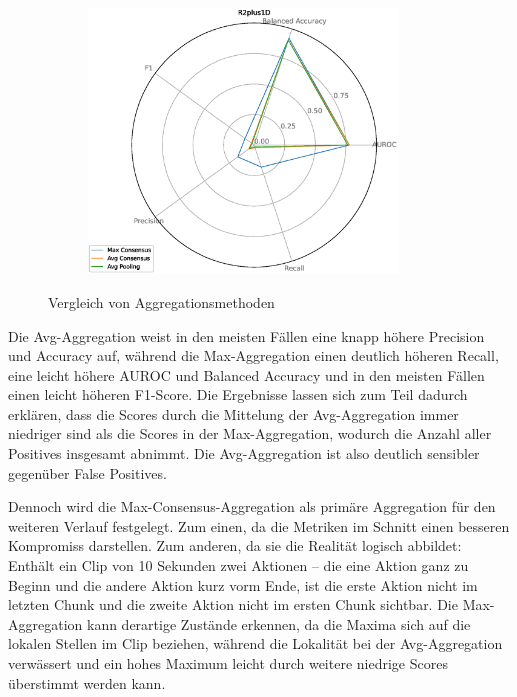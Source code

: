 \begin{figure}[htbp!]
\begin{subfigure}{.33\textwidth}
        \centering
        \includegraphics[width=0.9\textwidth, keepaspectratio, interpolate]{img/07_consensus_R2plus1D.eps}
    \end{subfigure}
    \caption{Vergleich von Aggregationsmethoden}
    \label{fig:consensus}
\end{figure}

Die Avg-Aggregation weist in den meisten Fällen eine knapp höhere Precision und Accuracy auf, während die Max-Aggregation einen deutlich höheren Recall, eine leicht höhere AUROC und Balanced Accuracy und in den meisten Fällen einen leicht höheren F1-Score.
Die Ergebnisse lassen sich zum Teil dadurch erklären, dass die Scores durch die Mittelung der Avg-Aggregation immer niedriger sind als die Scores in der Max-Aggregation, wodurch die Anzahl aller Positives insgesamt abnimmt.
Die Avg-Aggregation ist also deutlich sensibler gegenüber False Positives.

Dennoch wird die Max-Consensus-Aggregation als primäre Aggregation für den weiteren Verlauf festgelegt.
Zum einen, da die Metriken im Schnitt einen besseren Kompromiss darstellen.
Zum anderen, da sie die Realität logisch abbildet:
Enthält ein Clip von 10 Sekunden zwei Aktionen -- die eine Aktion ganz zu Beginn und die andere Aktion kurz vorm Ende, ist die erste Aktion nicht im letzten Chunk und die zweite Aktion nicht im ersten Chunk sichtbar.
Die Max-Aggregation kann derartige Zustände erkennen, da die Maxima sich auf die lokalen Stellen im Clip beziehen, während die Lokalität bei der Avg-Aggregation verwässert und ein hohes Maximum leicht durch weitere niedrige Scores überstimmt werden kann.

